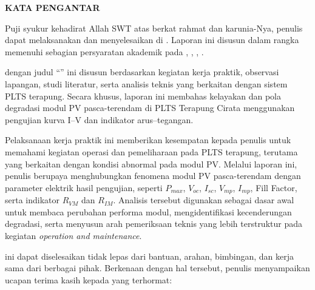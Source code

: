 \clearpage
{}
{}
\begin{center}
    \textbf{\large KATA PENGANTAR}\\[3em]
\end{center}

Puji syukur kehadirat Allah SWT atas berkat rahmat dan karunia-Nya, penulis dapat melaksanakan dan menyelesaikan {\tipe} di {\tempat}. Laporan ini disusun dalam rangka memenuhi sebagian persyaratan akademik pada {\prodi}, {\departemen}, {\fakultas}, {\universitas}.

{\tipe} dengan judul ``{\judulid}'' ini disusun berdasarkan kegiatan kerja praktik, observasi lapangan, studi literatur, serta analisis teknis yang berkaitan dengan sistem PLTS terapung. Secara khusus, laporan ini membahas kelayakan dan pola degradasi modul PV pasca-terendam di PLTS Terapung Cirata menggunakan pengujian kurva I--V dan indikator arus--tegangan.

Pelaksanaan kerja praktik ini memberikan kesempatan kepada penulis untuk memahami kegiatan operasi dan pemeliharaan pada PLTS terapung, terutama yang berkaitan dengan kondisi abnormal pada modul PV. Melalui laporan ini, penulis berupaya menghubungkan fenomena modul PV pasca-terendam dengan parameter elektrik hasil pengujian, seperti $P_{max}$, $V_{oc}$, $I_{sc}$, $V_{mp}$, $I_{mp}$, Fill Factor, serta indikator $R_{VM}$ dan $R_{IM}$. Analisis tersebut digunakan sebagai dasar awal untuk membaca perubahan performa modul, mengidentifikasi kecenderungan degradasi, serta menyusun arah pemeriksaan teknis yang lebih terstruktur pada kegiatan \textit{operation and maintenance}.

{\tipe} ini dapat diselesaikan tidak lepas dari bantuan, arahan, bimbingan, dan kerja sama dari berbagai pihak. Berkenaan dengan hal tersebut, penulis menyampaikan ucapan terima kasih kepada yang terhormat:

